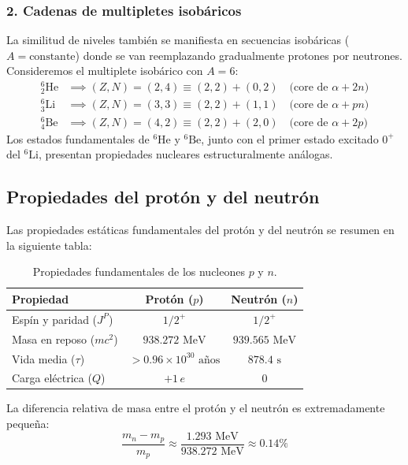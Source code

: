 \subsubsection*{2. Cadenas de multipletes isobáricos}
La similitud de niveles también se manifiesta en secuencias isobáricas ($A = \text{constante}$) donde se van reemplazando gradualmente protones por neutrones. Consideremos el multiplete isobárico con $A = 6$:
\begin{align}
    ^{6}_{2}\text{He} &\implies (Z, N) = (2, 4) \equiv (2, 2) + (0, 2) \quad \text{(core de } \alpha + 2n) \\
    ^{6}_{3}\text{Li} &\implies (Z, N) = (3, 3) \equiv (2, 2) + (1, 1) \quad \text{(core de } \alpha + pn) \\
    ^{6}_{4}\text{Be} &\implies (Z, N) = (4, 2) \equiv (2, 2) + (2, 0) \quad \text{(core de } \alpha + 2p)
\end{align}
Los estados fundamentales de $^{6}\text{He}$ y $^{6}\text{Be}$, junto con el primer estado excitado $0^+$ del $^{6}\text{Li}$, presentan propiedades nucleares estructuralmente análogas.

\subsection{Propiedades del protón y del neutrón}

Las propiedades estáticas fundamentales del protón y del neutrón se resumen en la siguiente tabla:

\begin{table}[htbp]
    \centering
    \begin{tabular}{lcc}
        \toprule
        \textbf{Propiedad} & \textbf{Protón ($p$)} & \textbf{Neutrón ($n$)} \\
        \midrule
        Espín y paridad ($J^P$) & $1/2^+$ & $1/2^+$ \\
        Masa en reposo ($m c^2$) & $938.272\text{ MeV}$ & $939.565\text{ MeV}$ \\
        Vida media ($\tau$) & $> 0.96 \times 10^{30}\text{ años}$ & $878.4\text{ s}$ \\
        Carga eléctrica ($Q$) & $+1\,e$ & $0$ \\
        \bottomrule
    \end{tabular}
    \caption{Propiedades fundamentales de los nucleones $p$ y $n$.}
    \label{tab:propiedades_nucleones}
\end{table}

La diferencia relativa de masa entre el protón y el neutrón es extremadamente pequeña:
\begin{equation}
    \frac{m_n - m_p}{m_p} \approx \frac{1.293\text{ MeV}}{938.272\text{ MeV}} \approx 0.14\%
\end{equation}


